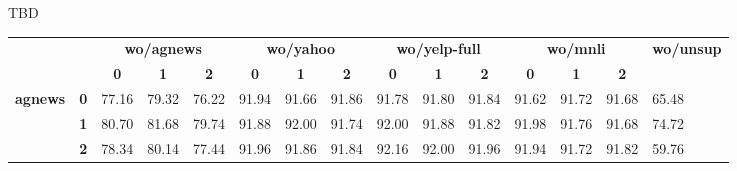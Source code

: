 \documentclass[11pt,a4paper]{article}
\begin{document}
TBD





\newpage
\appendix



\begin{table}
	\centering
	\fontsize{8}{12}
	\selectfont
	\begin{tabular}{lllllllllllllll}
		\toprule
		\multicolumn{1}{l}{\textbf{}}       & \textbf{}  & \multicolumn{3}{c}{\textbf{wo/agnews}}                                                              & \multicolumn{3}{c}{\textbf{wo/yahoo}}                                                               & \multicolumn{3}{c}{\textbf{wo/yelp-full}}                                                           & \multicolumn{3}{c}{\textbf{wo/mnli}}                                                                & \multicolumn{1}{c}{\multirow{2}{*}{\textbf{wo/unsup}}} \\
		\multicolumn{1}{l}{\textbf{}}       & \textbf{}  & \multicolumn{1}{c}{\textbf{0}} & \multicolumn{1}{c}{\textbf{1}} & \multicolumn{1}{c}{\textbf{2}} & \multicolumn{1}{c}{\textbf{0}} & \multicolumn{1}{c}{\textbf{1}} & \multicolumn{1}{c}{\textbf{2}} & \multicolumn{1}{c}{\textbf{0}} & \multicolumn{1}{c}{\textbf{1}} & \multicolumn{1}{c}{\textbf{2}} & \multicolumn{1}{c}{\textbf{0}} & \multicolumn{1}{c}{\textbf{1}} & \multicolumn{1}{c}{\textbf{2}} & \multicolumn{1}{c}{}    \\
		\hline
		\multirow{3}{*}{\textbf{agnews}}    & \textbf{0} & 77.16                          & 79.32                          & 76.22                          & 91.94                          & 91.66                          & 91.86                          & 91.78                          & 91.80                          & 91.84                          & 91.62                          & 91.72                          & 91.68                          & 65.48                              \\
		& \textbf{1} & 80.70                          & 81.68                          & 79.74                          & 91.88                          & 92.00                          & 91.74                          & 92.00                          & 91.88                          & 91.82                          & 91.98                          & 91.76                          & 91.68                          & 74.72                              \\
		& \textbf{2} & 78.34                          & 80.14                          & 77.44                          & 91.96                          & 91.86                          & 91.84                          & 92.16                          & 92.00                          & 91.96                          & 91.94                          & 91.72                          & 91.82                          & 59.76                              \\

\end{tabular}
\end{table}
\end{document}
